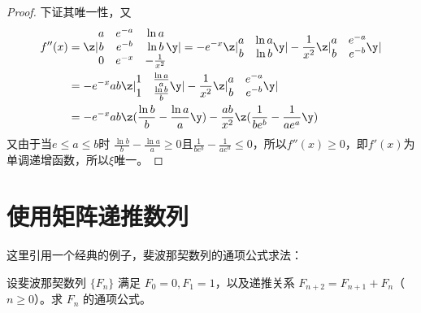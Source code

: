 \begin{proof}
下证其唯一性，又
\begin{align*}
f''(x)&=\z|\begin{matrix} 
                       a & e^{-a}    & \ln a \\
                       b & e^{-b}    & \ln b \\
                       0 & e^{-x}    & -\frac{1}{x^2} \end{matrix}  \y|
=- e^{-x} \z|\begin{matrix} 
                       a & \ln a    \\
                       b & \ln b    \\ \end{matrix}  \y| 
 - \frac{1}{x^2}\z|\begin{matrix} 
                       a & e^{-a}    \\
                       b & e^{-b}    \\ \end{matrix}  \y| \\
&=- e^{-x}ab \z|\begin{matrix} 
                       1 & \frac{\ln a}{a}\\
                       1 & \frac{\ln b}{b}    \\ \end{matrix}  \y| 
 - \frac{1}{x^2}\z|\begin{matrix} 
                       a & e^{-a}    \\
                       b & e^{-b}    \\ \end{matrix}  \y|\\
&=- e^{-x}ab \z(\frac{\ln b}{b} - \frac{\ln a}{a}\y) 
  - \frac{ab}{x^2} \z(\frac{1}{be^b} - \frac{1}{ae^a}\y) \\
\end{align*}
又由于当$e\le a\le b $时 $\frac{\ln b}{b} - \frac{\ln a}{a}\ge 0$且$\frac{1}{be^b} - \frac{1}{ae^a}\le 0$，所以$f''(x)\ge0$，即$f'(x)$为单调递增函数，所以$\xi$唯一。
\end{proof}

\section{使用矩阵递推数列}
这里引用一个经典的例子，斐波那契数列的通项公式求法：
\begin{example}
设斐波那契数列 \(\{F_n\}\) 满足 \(F_0=0, F_1=1\)，以及递推关系 \(F_{n+2}=F_{n+1}+F_n\)（\(n\ge 0\)）。求 \(F_n\) 的通项公式。
\end{example}

